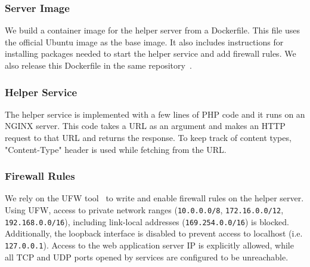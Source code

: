 \subsubsection{Server Image}
We build a container image for the helper server from a Dockerfile. This file uses the official Ubuntu image as the base image. It also includes instructions for installing packages needed to start the helper service and add firewall rules. We also release this Dockerfile in the same repository~\cite{code-place}.

\subsubsection{Helper Service}
The helper service is implemented with a few lines of PHP code and it runs on an NGINX server. This code takes a URL as an argument and makes an HTTP request to that URL and returns the response. To keep track of content types, "Content-Type" header is used while fetching from the URL.

\subsubsection{Firewall Rules}
We rely on the UFW tool~\cite{ufw_website} to write and enable firewall rules on the helper server. Using UFW, access to private network ranges (\texttt{10.0.0.0/8}, \texttt{172.16.0.0/12}, \texttt{192.168.0.0/16}), including link-local addresses (\texttt{169.254.0.0/16}) is blocked. Additionally, the loopback interface is disabled to prevent access to localhost (i.e. \texttt{127.0.0.1}). Access to the web application server IP is explicitly allowed, while all TCP and UDP ports opened by services are configured to be unreachable.  
